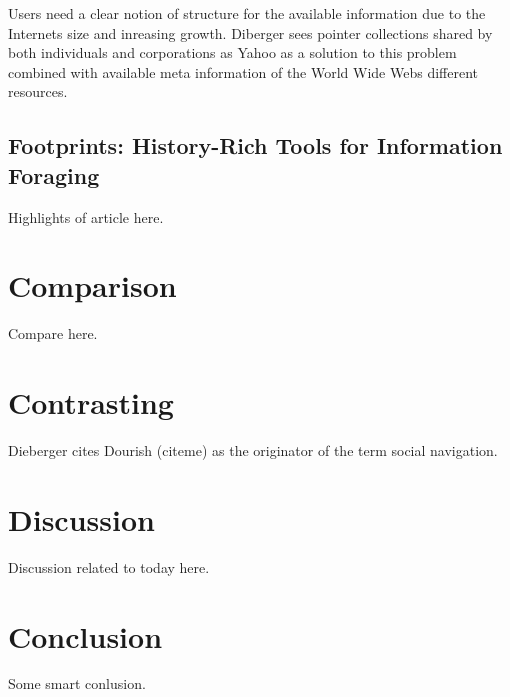 \documentclass[12pt,a4paper]{article}
\begin{document}
Users need a clear notion of structure for the available information due to
the Internets size and inreasing growth. Diberger sees pointer collections
shared by both individuals and corporations as Yahoo as a solution to this
problem combined with available meta information of the World Wide Webs
different resources.



\subsection{Footprints: History-Rich Tools for Information Foraging}

Highlights of article here.

\section{Comparison}

Compare here.

\section{Contrasting}

Dieberger cites Dourish (citeme) as the originator of the term social
navigation.

\section{Discussion}

Discussion related to today here.

\section{Conclusion}

Some smart conlusion.

\section{}




\end{document}
